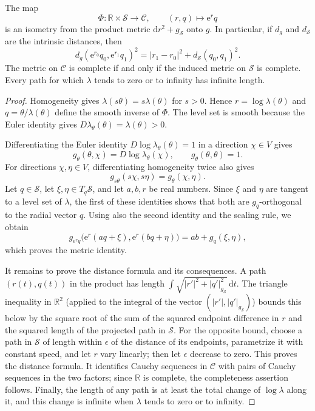 \begin{proposition}\label{prop:gaud-volume-metric-product}
The map
\[
 \Phi:\mathbb R\times\mathscr S\longrightarrow\mathscr C,
 \qquad (r,q)\longmapsto \mathrm{e}^r q
\]
is an isometry from the product metric $\mathrm{d}r^2+g_{\mathscr S}$ onto $g$. In particular, if $d_g$ and $d_{\mathscr S}$ are the intrinsic distances, then
\[
 d_g(\mathrm{e}^{r_0}q_0,\mathrm{e}^{r_1}q_1)^2
    =|r_1-r_0|^2+d_{\mathscr S}(q_0,q_1)^2.
\]
The metric on $\mathscr C$ is complete if and only if the induced metric on $\mathscr S$ is complete. Every path for which $\lambda$ tends to zero or to infinity has infinite length.
\end{proposition}
\begin{proof}
Homogeneity gives $\lambda(s\theta)=s\lambda(\theta)$ for $s>0$. Hence $r=\log\lambda(\theta)$ and $q=\theta/\lambda(\theta)$ define the smooth inverse of $\Phi$. The level set is smooth because the Euler identity gives $D\lambda_\theta(\theta)=\lambda(\theta)>0$.

Differentiating the Euler identity $D\log\lambda_\theta(\theta)=1$ in a direction $\chi\in V$ gives
\[
 g_\theta(\theta,\chi)=D\log\lambda_\theta(\chi),
 \qquad g_\theta(\theta,\theta)=1.
\]
For directions $\chi,\eta\in V$, differentiating homogeneity twice also gives
\[
 g_{s\theta}(s\chi,s\eta)=g_\theta(\chi,\eta).
\]
Let $q\in\mathscr S$, let $\xi,\eta\in T_q\mathscr S$, and let $a,b,r$ be real numbers. Since $\xi$ and $\eta$ are tangent to a level set of $\lambda$, the first of these identities shows that both are $g_q$-orthogonal to the radial vector $q$. Using also the second identity and the scaling rule, we obtain
\[
 g_{\mathrm{e}^rq}\bigl(\mathrm{e}^r(aq+\xi),\mathrm{e}^r(bq+\eta)\bigr)
       =ab+g_q(\xi,\eta),
\]
which proves the metric identity.

It remains to prove the distance formula and its consequences. A path $(r(t),q(t))$ in the product has length
$\int\sqrt{|r'|^2+|q'|_{g_{\mathscr S}}^2}\,\mathrm{d}t$.
The triangle inequality in $\mathbb R^2$ (applied to the integral of the vector $(|r'|,|q'|_{g_{\mathscr S}})$) bounds this below by the square root of the sum of the squared endpoint difference in $r$ and the squared length of the projected path in $\mathscr S$. For the opposite bound, choose a path in $\mathscr S$ of length within $\epsilon$ of the distance of its endpoints, parametrize it with constant speed, and let $r$ vary linearly; then let $\epsilon$ decrease to zero. This proves the distance formula. It identifies Cauchy sequences in $\mathscr C$ with pairs of Cauchy sequences in the two factors; since $\mathbb R$ is complete, the completeness assertion follows. Finally, the length of any path is at least the total change of $\log\lambda$ along it, and this change is infinite when $\lambda$ tends to zero or to infinity.
\end{proof}

